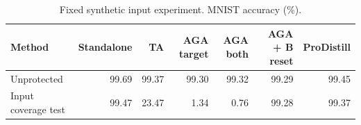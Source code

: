\begin{table}[t]
\centering\small
\caption{Fixed synthetic input experiment. MNIST accuracy (\%).}
\begin{tabular}{lrrrrrr}
\toprule
Method & Standalone & TA & AGA target & AGA both & AGA + B reset & ProDistill \\
\midrule
Unprotected & 99.69 & 99.37 & 99.30 & 99.32 & 99.29 & 99.45 \\
Input coverage test & 99.47 & 23.47 & 1.34 & 0.76 & 99.28 & 99.37 \\
\bottomrule
\end{tabular}
\end{table}
